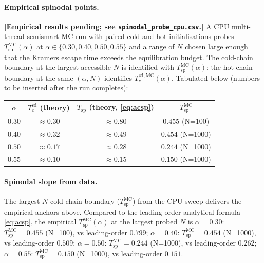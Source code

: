 \documentclass[11pt]{article}
\begin{document}
\paragraph{Empirical spinodal points.}
\label{sec:mc:spinodal-empirical}
\textbf{[Empirical results pending; see \texttt{spinodal\_probe\_cpu.csv}.]}
A CPU multi-thread semismart MC run with paired cold and hot
initialisations probes $T_{\mathrm{sp}}^{\mathrm{MC}}(\alpha)$ at
$\alpha \in \{0.30, 0.40, 0.50, 0.55\}$ and a range of $N$ chosen
large enough that the Kramers escape time exceeds the equilibration
budget. The cold-chain boundary at the largest accessible $N$ is
identified with $T_{\mathrm{sp}}^{\mathrm{MC}}(\alpha)$; the
hot-chain boundary at the same $(\alpha, N)$ identifies
$T_c^{\mathrm{sd},\mathrm{MC}}(\alpha)$. Tabulated below
(numbers to be inserted after the run completes):
\begin{center}
\begin{tabular}{cccc}
\hline
$\alpha$ & $T_c^{\mathrm{sd}}$ (theory) &
$T_{\mathrm{sp}}$ (theory, \eqref{eq:acsp}) &
$T_{\mathrm{sp}}^{\mathrm{MC}}$ \\
\hline
$0.30$ & $\approx 0.30$ & $\approx 0.80$ & $0.455$ {\small(N=100)} \\
$0.40$ & $\approx 0.32$ & $\approx 0.49$ & $0.454$ {\small(N=1000)} \\
$0.50$ & $\approx 0.17$ & $\approx 0.28$ & $0.244$ {\small(N=1000)} \\
$0.55$ & $\approx 0.10$ & $\approx 0.15$ & $0.150$ {\small(N=1000)} \\
\hline
\end{tabular}
\end{center}

\paragraph{Spinodal slope from data.}
The largest-$N$ cold-chain boundary ($T_{\mathrm{sp}}^{\mathrm{MC}}$)
from the CPU sweep delivers the empirical anchors above. Compared to the
leading-order analytical formula \eqref{eq:acsp}, the empirical
$T_{\mathrm{sp}}^{\mathrm{MC}}(\alpha)$ at the largest probed $N$ is
\(\alpha=0.30\): \(T_{\mathrm{sp}}^{\mathrm{MC}}=0.455\) (N=100), vs leading-order \(0.799\); \(\alpha=0.40\): \(T_{\mathrm{sp}}^{\mathrm{MC}}=0.454\) (N=1000), vs leading-order \(0.509\); \(\alpha=0.50\): \(T_{\mathrm{sp}}^{\mathrm{MC}}=0.244\) (N=1000), vs leading-order \(0.262\); \(\alpha=0.55\): \(T_{\mathrm{sp}}^{\mathrm{MC}}=0.150\) (N=1000), vs leading-order \(0.151\).
\end{document}

